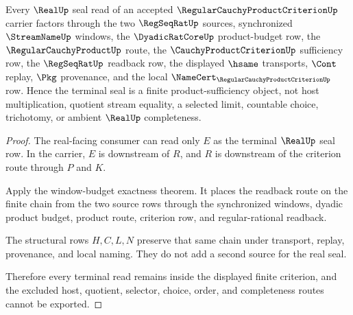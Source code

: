 \begin{theorem}
\label{thm:regular-cauchy-product-criterion-real-seal-nonescape}
Every $\RealUp$ seal read of an accepted $\RegularCauchyProductCriterionUp$ carrier factors through the two $\RegSeqRatUp$ sources, synchronized $\StreamNameUp$ windows, the $\DyadicRatCoreUp$ product-budget row, the $\RegularCauchyProductUp$ route, the $\CauchyProductCriterionUp$ sufficiency row, the $\RegSeqRatUp$ readback row, the displayed $\hsame$ transports, $\Cont$ replay, $\Pkg$ provenance, and the local $\NameCert_{\RegularCauchyProductCriterionUp}$ row. Hence the terminal seal is a finite product-sufficiency object, not host multiplication, quotient stream equality, a selected limit, countable choice, trichotomy, or ambient $\RealUp$ completeness.
\end{theorem}
\begin{proof}
The real-facing consumer can read only $E$ as the terminal $\RealUp$ seal row. In the carrier, $E$ is downstream of $R$, and $R$ is downstream of the criterion route through $P$ and $K$.

Apply the window-budget exactness theorem. It places the readback route on the finite chain from the two source rows through the synchronized windows, dyadic product budget, product route, criterion row, and regular-rational readback.

The structural rows $H,C,L,N$ preserve that same chain under transport, replay, provenance, and local naming. They do not add a second source for the real seal.

Therefore every terminal read remains inside the displayed finite criterion, and the excluded host, quotient, selector, choice, order, and completeness routes cannot be exported.
\end{proof}


